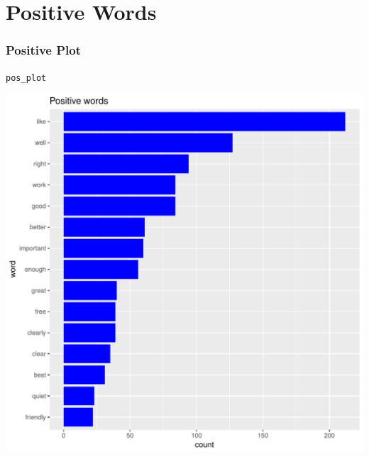 \documentclass[10pt]{beamer}\usepackage[]{graphicx}\usepackage[]{color}
\makeatletter
\def\maxwidth{ %
  \ifdim\Gin@nat@width>\linewidth
    \linewidth
  \else
    \Gin@nat@width
  \fi
}
\newcommand{\hlstd}[1]{\textcolor[rgb]{0.345,0.345,0.345}{#1}}%
\newenvironment{kframe}{%
 \def\at@end@of@kframe{}%
 \ifinner\ifhmode%
  \def\at@end@of@kframe{\end{minipage}}%
  \begin{minipage}{\columnwidth}%
 \fi\fi%
 \def\FrameCommand##1{\hskip\@totalleftmargin \hskip-\fboxsep
 \colorbox{shadecolor}{##1}\hskip-\fboxsep
     \hskip-\linewidth \hskip-\@totalleftmargin \hskip\columnwidth}%
 \MakeFramed {\advance\hsize-\width
   \@totalleftmargin\z@ \linewidth\hsize
   \@setminipage}}%
 {\par\unskip\endMakeFramed%
 \at@end@of@kframe}
\newenvironment{knitrout}{}{} %
\makeatother
\begin{document}
\section{Positive Words}
\begin{frame}[fragile]
  \frametitle{Positive Plot}
\begin{knitrout}
\color{fgcolor}\begin{kframe}
\begin{alltt}
\hlstd{pos_plot}
\end{alltt}
\end{kframe}
\includegraphics[width=\maxwidth]{figure/unnamed-chunk-12-1} 

\end{knitrout}
\end{frame}
\end{document}
